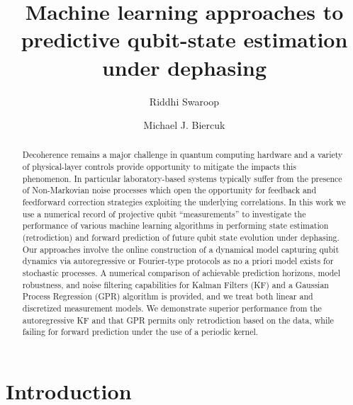 \documentclass[pra, reprint]{revtex4-1}
\begin{document}
	
%
\title{Machine learning approaches to predictive qubit-state estimation under dephasing}

\author{Riddhi Swaroop} 

\author{Michael J. Biercuk}

\begin{abstract}
Decoherence remains a major challenge in quantum computing hardware and a variety of physical-layer controls provide opportunity to mitigate the impacts this phenomenon.  In particular laboratory-based systems typically suffer from the presence of Non-Markovian noise processes which open the opportunity for feedback and feedforward correction strategies exploiting the underlying correlations. In this work we use a numerical record of projective qubit ``measurements'' to investigate the performance of various machine learning algorithms in performing state estimation (retrodiction) and forward prediction of future qubit state evolution under dephasing. Our approaches involve the online construction of a dynamical model capturing qubit dynamics via autoregressive or Fourier-type protocols as no a priori model exists for stochastic processes. A numerical comparison of achievable prediction horizons, model robustness, and noise filtering capabilities for Kalman Filters (KF) and a Gaussian Process Regression (GPR) algorithm is provided, and we treat both linear and discretized measurement models. We demonstrate superior performance from the autoregressive KF and that GPR permits only retrodiction based on the data, while failing for forward prediction under the use of a periodic kernel.  
\end{abstract}

\maketitle

%
\section{Introduction} 
\end{document}
